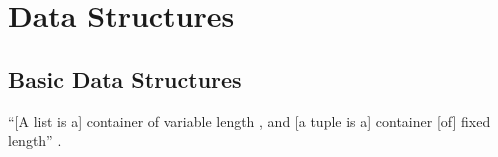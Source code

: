 









\chapter{Data Structures}
\label{chp:DataStructures}


\section{Basic Data Structures}
\label{sec:BasicDataStructures}

``[A list is a] container of variable length , and [a tuple is a] container [of] fixed length'' \cite[\S4.3 pp. 111]{Tate2010}.


